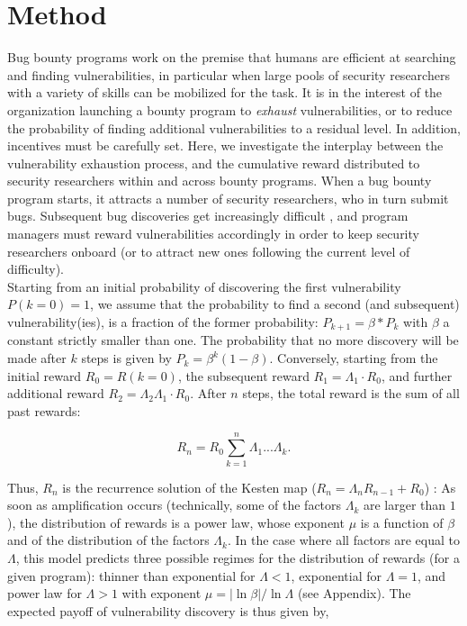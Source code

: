 \section{Method}
\label{sec:method}
Bug bounty programs work on the premise that humans are efficient at searching and finding vulnerabilities, in particular when large pools of security researchers with a variety of skills can be mobilized for the task. It is in the interest of the organization launching a bounty program to {\it exhaust} vulnerabilities, or to reduce the probability of finding additional vulnerabilities to a residual level. In addition, incentives must be carefully set. Here, we investigate the interplay between the vulnerability exhaustion process, and the cumulative reward distributed to security researchers within and across bounty programs. When a bug bounty program starts, it attracts a number of security researchers, who in turn submit bugs. Subsequent bug discoveries get increasingly difficult \cite{brady1999murphy}, and program managers must reward vulnerabilities accordingly in order to keep security researchers onboard (or to attract new ones following the current level of difficulty). \\ %

Starting from an initial probability of discovering the first vulnerability $P(k=0) = 1$, we assume that the probability to find a second (and subsequent) vulnerability(ies), is a fraction of the former probability: $P_{k+1} = \beta * P_k$ with $\beta$ a constant strictly smaller than one. The probability that no more discovery will be made after $k$ steps is given by $P_k = \beta^{k} (1-\beta)$. Conversely, starting from the initial reward $R_0 = R(k=0)$, the subsequent reward $R_1 = \Lambda_1 \cdot R_0$, and further additional reward $ R_2 = \Lambda_2 \Lambda_1 \cdot R_{0}$. After $n$ steps, the total reward is the sum of all past rewards: 

\begin{equation}
R_{n} = R_{0} \sum_{k=1}^{n} \Lambda_1 ... \Lambda_k.
\end{equation}

Thus, $R_{n}$ is the recurrence solution of the  
Kesten map ($R_{n} = \Lambda_n R_{n-1} +R_0$)
\cite{kesten1973random,sornette1997convergent}:  As soon as amplification occurs (technically, 
some of the factors $\Lambda_k$ are larger than $1$), the distribution
of rewards is a power law, whose exponent $\mu$ is a function of $\beta$
and of the distribution of the factors $\Lambda_k$. In the case where
all factors are equal to $\Lambda$, this model predicts three possible regimes for the distribution of rewards (for a given program): thinner than exponential for $\Lambda < 1$, exponential for $\Lambda = 1$, and power law for $\Lambda > 1$ with exponent $\mu = |\ln \beta|/ \ln \Lambda$ (see Appendix). The expected payoff of vulnerability discovery is thus given by,

